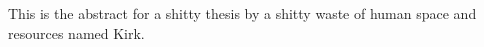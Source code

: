 This is the abstract for a shitty thesis by a shitty waste of human space and
resources named Kirk. 
